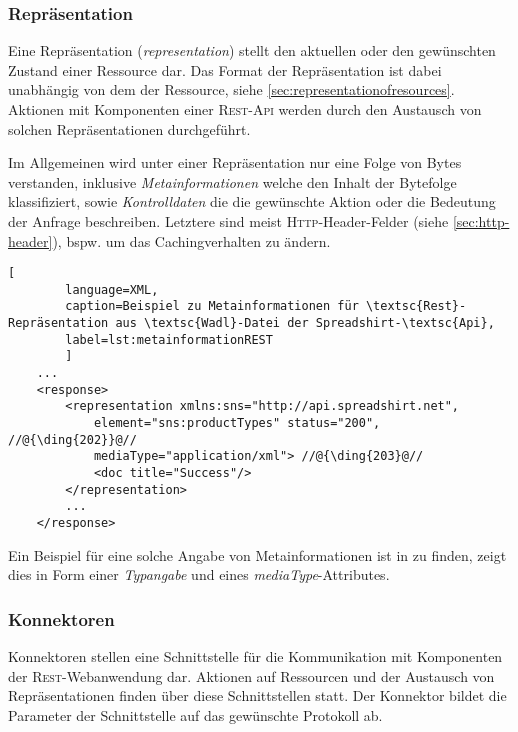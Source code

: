 \subsubsection{Repräsentation}

Eine Repräsentation (\emph{representation}) stellt den aktuellen oder den gewünschten Zustand einer Ressource dar. Das Format der Repräsentation ist dabei unabhängig von dem der Ressource, siehe \cref{sec:representationofresources}.
Aktionen mit Komponenten einer \textsc{Rest}-\textsc{Api} werden durch den Austausch von solchen Repräsentationen durchgeführt.

Im Allgemeinen wird unter einer Repräsentation nur eine Folge von Bytes verstanden, inklusive \emph{Metainformationen} welche den Inhalt der Bytefolge klassifiziert, sowie \emph{Kontrolldaten} die die gewünschte Aktion oder die Bedeutung der Anfrage beschreiben. Letztere sind meist \textsc{Http}-Header-Felder (siehe \cref{sec:http-header}), bspw. um das Cachingverhalten zu ändern.

\begin{minipage}{\textwidth}
    \begin{lstlisting}[
        language=XML,
        caption=Beispiel zu Metainformationen für \textsc{Rest}-Repräsentation aus \textsc{Wadl}-Datei der Spreadshirt-\textsc{Api},
        label=lst:metainformationREST
        ]
    ...
    <response>
        <representation xmlns:sns="http://api.spreadshirt.net",
            element="sns:productTypes" status="200", //@{\ding{202}}@//
            mediaType="application/xml"> //@{\ding{203}@//
            <doc title="Success"/>
        </representation>
        ...
    </response>
    \end{lstlisting}
\end{minipage}

Ein Beispiel für eine solche Angabe von Metainformationen ist in  zu finden,  zeigt dies in Form einer \emph{Typangabe} und  eines \emph{mediaType}-Attributes.

\subsubsection{Konnektoren}

Konnektoren stellen eine Schnittstelle für die Kommunikation mit Komponenten der \textsc{Rest}-Webanwendung dar. Aktionen auf Ressourcen und der Austausch von Repräsentationen finden über diese Schnittstellen statt. Der Konnektor bildet die Parameter der Schnittstelle auf das gewünschte Protokoll ab.

